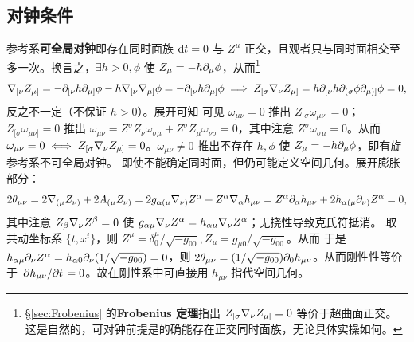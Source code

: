 \subsection{对钟条件}\label{sec:sync-clock}

参考系\textbf{可全局对钟}即存在同时面族 $\dd t = 0$ 与 $Z^\mu$ 正交，且观者只与同时面相交至多一次。换言之，$\exists h> 0, \phi$ 使 $Z_\mu = -h\partial_\mu \phi$，从而\footnote{ \S\ref{sec:Frobenius} 的\textbf{Frobenius 定理}指出 $Z_{[\sigma}\nabla_{\nu} Z_{\mu]} = 0$ 等价于超曲面正交。这是自然的，可对钟前提是的确能存在正交同时面族，无论具体实操如何。}
\[\nabla_{[\nu} Z_{\mu]} = -\partial_{[\nu} h \partial_{\mu]}\phi -h \nabla_{[\nu} \nabla_{\mu]}\phi = -\partial_{[\nu} h \partial_{\mu]}\phi\implies Z_{[\sigma}\nabla_{\nu} Z_{\mu]} = h\partial_{[\nu} h \partial_{(\sigma}\phi \partial_{\mu)]}\phi = 0,\]
反之不一定（不保证 $h>0$）。展开可知
可见 $\omega_{\mu\nu} = 0$ 推出 $ Z_{[\sigma} \omega_{\mu\nu]} = 0$；$Z_{[\sigma} \omega_{\mu\nu]} = 0$ 推出 $\omega_{\mu\nu} = Z^\sigma Z_{\nu} \omega_{\sigma\mu} + Z^\sigma Z_{\mu} \omega_{\nu\sigma} = 0$，其中注意 $Z^\sigma \omega_{\sigma\mu} = 0$。从而 $\omega_{\mu\nu} = 0\iff Z_{[\sigma}\nabla_{\nu} Z_{\mu]} = 0$。$\omega_{\mu\nu} \ne 0$ 推出不存在 $h,\phi$ 使 $Z_\mu = -h\partial_\mu \phi$，即有旋参考系不可全局对钟。
即使不能确定同时面，但仍可能定义空间几何。展开膨胀部分：
\[2\theta_{\mu\nu} =2\nabla_{(\mu}Z_{\nu)}+2 A_{(\mu}Z_{\nu)}
=2g_{\alpha(\mu}\nabla_{\nu)} Z^\alpha
+Z^\alpha\nabla_\alpha h_{\mu\nu}=Z^\alpha\partial_\alpha h_{\mu\nu}
  +2h_{\alpha(\mu}\partial_{\nu)} Z^\alpha = 0,\]
其中注意 $Z_{\beta}\nabla_\nu Z^\beta = 0$ 使 $g_{\alpha\mu}\nabla_{\nu} Z^\alpha=h_{\alpha\mu}\nabla_{\nu} Z^\alpha$；无挠性导致克氏符抵消。
取共动坐标系 $\{t,x^i\}$，则 $Z^\mu = \delta^\mu_0/\sqrt{-g_{00}},Z_\mu = g_{\mu 0}/\sqrt{-g_{00}}$。从而
于是 $h_{\alpha\mu}\partial_{\nu} Z^\alpha = h_{\alpha 0}\partial_{\nu}(1/\sqrt{-g_{00}})=0$，则 $2\theta_{\mu\nu} = (1/\sqrt{-g_{00}})\partial_0 h_{\mu\nu}$。从而刚性性等价于 $\pdv*{h_{\mu\nu}}{t}=0$。故在刚性系中可直接用 $h_{\mu\nu}$ 指代空间几何。


